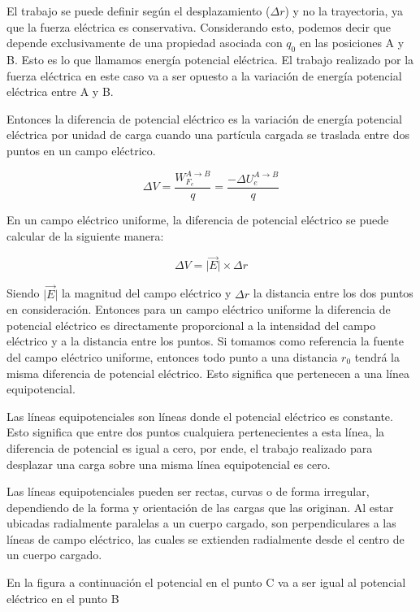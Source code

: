 \documentclass{article}
\begin{document}
El trabajo se puede definir según el desplazamiento ($\Delta r$) y no la trayectoria, ya que la fuerza eléctrica es conservativa. Considerando esto, podemos decir que depende exclusivamente de una propiedad asociada con $q_0$ en las posiciones A y B. Esto es lo que llamamos energía potencial eléctrica. El trabajo realizado por la fuerza eléctrica en este caso va a ser opuesto a la variación de energía potencial eléctrica entre A y B.

Entonces la diferencia de potencial eléctrico es la variación de energía potencial eléctrica por unidad de carga cuando una partícula cargada se traslada entre dos puntos en un campo eléctrico.

\begin{equation*}
  \Delta V=\frac{W_{F_e}^{A \rightarrow B}}{q}=\frac{-\Delta U_e^{A \rightarrow B}}{q}
\end{equation*}

En un campo eléctrico uniforme, la diferencia de potencial eléctrico se puede calcular de la siguiente manera:

\begin{equation*}
  \Delta V = \lvert \vec{E} \rvert \times \Delta r
\end{equation*}

Siendo $\lvert \vec{E} \rvert$ la magnitud del campo eléctrico y $\Delta r$ la distancia entre los dos puntos en consideración. Entonces para un campo eléctrico uniforme la diferencia de potencial eléctrico es directamente proporcional a la intensidad del campo eléctrico y a la distancia entre los puntos. Si tomamos como referencia la fuente del campo eléctrico uniforme, entonces todo punto a una distancia $r_0$ tendrá la misma diferencia de potencial eléctrico. Esto significa que pertenecen a una línea equipotencial.

Las líneas equipotenciales son líneas donde el potencial eléctrico es constante. Esto significa que entre dos puntos cualquiera pertenecientes a esta línea, la diferencia de potencial es igual a cero, por ende, el trabajo realizado para desplazar una carga sobre una misma línea equipotencial es cero.

Las líneas equipotenciales pueden ser rectas, curvas o de forma irregular, dependiendo de la forma y orientación de las cargas que las originan. Al estar ubicadas radialmente paralelas a un cuerpo cargado, son perpendiculares a las líneas de campo eléctrico, las cuales se extienden radialmente desde el centro de un cuerpo cargado.

En la figura a continuación el potencial en el punto C va a ser igual al potencial eléctrico en el punto B
\end{document}

